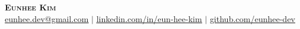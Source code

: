 \documentclass[letterpaper,11pt]{article}
\makeatletter
\newcommand{\resumeItem}[1]{
  \item\small{
    {#1 \vspace{-2pt}}
  }
}
\newcommand{\resumeSubheading}[4]{
  \vspace{-2pt}\item
    \begin{tabular*}{0.97\textwidth}[t]{l@{\extracolsep{\fill}}r}
      \textbf{#1} & #2 \\
      \textit{\small#3} & \textit{\small #4} \\
    \end{tabular*}\vspace{-7pt}
}
\newcommand{\resumeSubSubheading}[2]{
    \item
    \begin{tabular*}{0.97\textwidth}{l@{\extracolsep{\fill}}r}
      \textit{\small#1} & \textit{\small #2} \\
    \end{tabular*}\vspace{-7pt}
}
\newcommand{\resumeSubHeadingListEnd}{\end{itemize}}
\newcommand{\resumeItemListStart}{\begin{itemize}}
\newcommand{\resumeItemListEnd}{\end{itemize}\vspace{-5pt}}
\makeatother
\begin{document}

\begin{center}
    \textbf{\Huge \scshape Eunhee Kim} \\ \vspace{1pt}
    \href{mailto:eunhee.dev@gmail.com}{\underline{eunhee.dev@gmail.com}} $|$ 
    \href{https://www.linkedin.com/in/eun-hee-kim/}{\underline{linkedin.com/in/eun-hee-kim}} $|$
    \href{https://github.com/eunhee-dev}{\underline{github.com/eunhee-dev}}
\end{center}



\end{document}
